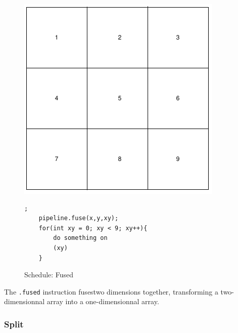 \begin{figure}[H]

		\begin{minipage}[c]{\EIW}
			\centering
		\includegraphics[width=\textwidth]{Images/BaseOrder.png}
		\end{minipage}
		\begin{minipage}[c]{\ECW}
			\centering
\begin{lstlisting}[label={code:reorder}];
    pipeline.fuse(x,y,xy);
	for(int xy = 0; xy < 9; xy++){
		do something on
		(xy)
	}
\end{lstlisting}
		\end{minipage}
		\caption{Schedule: Fused}
		\label{schedule:fuse}
\end{figure}

	The \verb|.fused| instruction  fusestwo dimensions together, transforming a two-dimensionnal array into a one-dimensionnal array. 


\subsubsection{Split}

